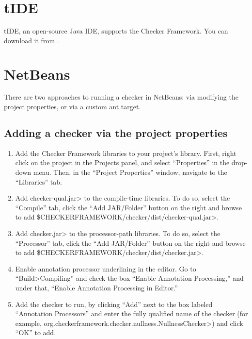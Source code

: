 \section{tIDE\label{tide}}

\begin{sloppypar}
tIDE, an open-source Java IDE, supports the Checker Framework.
You can download it from .
\end{sloppypar}


\section{NetBeans\label{netbeans}}

There are two approaches to running a checker in NetBeans:  via modifying the project properties, or via a custom ant target.


\subsection{Adding a checker via the project properties\label{netbeans-project-properties}}

\begin{enumerate}
\item
  Add the Checker Framework libraries to your project's
  library. First, right click on the project in the Projects panel,
  and select ``Properties'' in the drop-down menu. Then, in the
  ``Project Properties'' window, navigate to the ``Libraries'' tab.

\item
  Add \<checker-qual.jar> to the compile-time libraries. To do so,
  select the ``Compile'' tab, click the ``Add JAR/Folder'' button on
  the right and browse to
  add \<\$CHECKERFRAMEWORK/checker/dist/checker-qual.jar>.

\item
  Add \<checker.jar> to the processor-path libraries. To do so, select
  the ``Processor'' tab, click the ``Add JAR/Folder'' button on the
  right and browse to
  add \<\$CHECKERFRAMEWORK/checker/dist/checker.jar>.

\item
  Enable annotation processor underlining in the editor. Go to
  ``Build>Compiling'' and check the box ``Enable Annotation
  Processing,'' and under that, ``Enable Annotation Processing in
  Editor.''

\item
  Add the checker to run, by clicking ``Add'' next to the box labeled
  ``Annotation Processors'' and enter the fully qualified name of the
  checker (for
  example, \<org.checkerframework.checker.nullness.NullnessChecker>)
  and click ``OK'' to add.
\end{enumerate}

